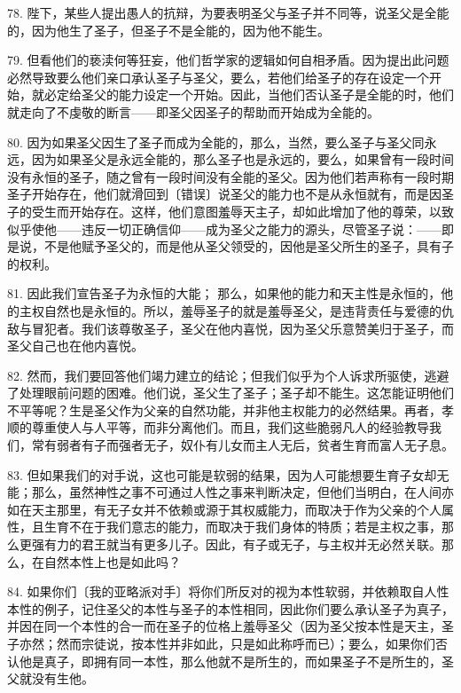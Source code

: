 78. 陛下，某些人提出愚人的抗辩，为要表明圣父与圣子并不同等，说圣父是全能的，因为他生了圣子，但圣子不是全能的，因为他不能生。\par

79. 但看他们的亵渎何等狂妄，他们哲学家的逻辑如何自相矛盾。因为提出此问题必然导致要么他们亲口承认圣子与圣父，要么，若他们给圣子的存在设定一个开始，就必定给圣父的能力设定一个开始。因此，当他们否认圣子是全能的时，他们就走向了不虔敬的断言——即圣父因圣子的帮助而开始成为全能的。\par

80. 因为如果圣父因生了圣子而成为全能的，那么，当然，要么圣子与圣父同永远，因为如果圣父是永远全能的，那么圣子也是永远的，要么，如果曾有一段时间没有永恒的圣子，随之曾有一段时间没有全能的圣父。因为他们若声称有一段时期圣子开始存在，他们就滑回到〔错误〕说圣父的能力也不是从永恒就有，而是因圣子的受生而开始存在。这样，他们意图羞辱天主子，却如此增加了他的尊荣，以致似乎使他——违反一切正确信仰——成为圣父之能力的源头，尽管圣子说：——即是说，不是他赋予圣父的，而是他从圣父领受的，因他是圣父所生的圣子，具有子的权利。\par

81. 因此我们宣告圣子为永恒的大能； 那么，如果他的能力和天主性是永恒的，他的主权自然也是永恒的。所以，羞辱圣子的就是羞辱圣父，是违背责任与爱德的仇敌与冒犯者。我们该尊敬圣子，圣父在他内喜悦，因为圣父乐意赞美归于圣子，而圣父自己也在他内喜悦。\par

82. 然而，我们要回答他们竭力建立的结论；但我们似乎为个人诉求所驱使，逃避了处理眼前问题的困难。他们说，圣父生了圣子；圣子却不能生。这怎能证明他们不平等呢？生是圣父作为父亲的自然功能，并非他主权能力的必然结果。再者，孝顺的尊重使人与人平等，而非分离他们。而且，我们这些脆弱凡人的经验教导我们，常有弱者有子而强者无子，奴仆有儿女而主人无后，贫者生育而富人无子息。\par

83. 但如果我们的对手说，这也可能是软弱的结果，因为人可能想要生育子女却无能；那么，虽然神性之事不可通过人性之事来判断决定，但他们当明白，在人间亦如在天主那里，有无子女并不依赖或源于其权威能力，而取决于作为父亲的个人属性，且生育不在于我们意志的能力，而取决于我们身体的特质；若是主权之事，那么更强有力的君王就当有更多儿子。因此，有子或无子，与主权并无必然关联。那么，在自然本性上也是如此吗？\par

84. 如果你们〔我的亚略派对手〕将你们所反对的视为本性软弱，并依赖取自人性本性的例子，记住圣父的本性与圣子的本性相同，因此你们要么承认圣子为真子，并因在同一个本性的合一而在圣子的位格上羞辱圣父（因为圣父按本性是天主，圣子亦然；然而宗徒说，按本性并非如此，只是如此称呼而已）；要么，如果你们否认他是真子，即拥有同一本性，那么他就不是所生的，而如果圣子不是所生的，圣父就没有生他。\par


